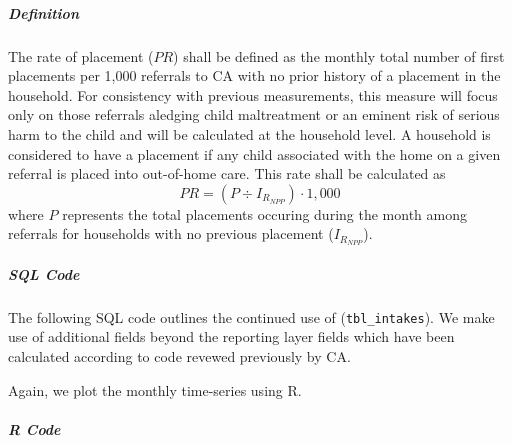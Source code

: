 \documentclass[12pt]{article}\usepackage[]{graphicx}\usepackage[]{color}
\begin{document}
\subparagraph{Definition} The rate of placement ($PR$) shall be defined as the monthly total number of first placements per 1,000 referrals to CA with no prior history of a placement in the household. For consistency with previous measurements, this measure will focus only on those referrals aledging child maltreatment or an eminent risk of serious harm to the child and will be calculated at the household level. A household is considered to have a placement if any child associated with the home on a given referral is placed into out-of-home care. This rate shall be calculated as 
\begin{equation}\label{eq:PR}
PR = (P \div I_{R_{NPP}}) \cdot 1,000
\end{equation}
where $P$ represents the total placements occuring during the month among referrals for households with no previous placement ($I_{R_{NPP}}$). 

\subparagraph{SQL Code}

The following SQL code outlines the continued use of (\texttt{tbl\_intakes}). We make use of additional fields beyond the reporting layer fields which have been calculated according to code revewed previously by CA. 



Again, we plot the monthly time-series using R.  

\subparagraph{R Code}
\end{document}

